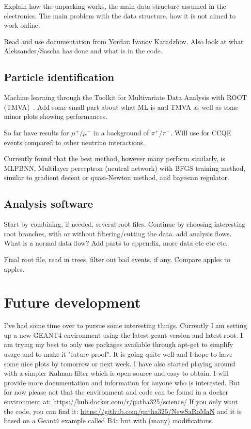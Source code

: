 Explain how the unpacking works, the main data structure assumed in the electronics. The main problem with the data structure, how it is not aimed to work online. 

Read and use documentation from Yordan Ivanov Karadzhov. Also look at what Aleksander/Sascha has done and what is in the code.


\subsection{Particle identification}
Machine learning through the Toolkit for Multivariate Data Analysis with ROOT (TMVA)~\cite{TMVA}. Add some small part about what ML is and TMVA as well as some minor plots showing performances.

So far have results for $\mu^+/\mu^-$ in a background of  $\pi^+/\pi^-$. Will use for CCQE events compared to other neutrino interactions.

Currently found that the best method, however many perform similarly, is MLPBNN, Multilayer perceptron (neutral network) with BFGS training method, similar to gradient decent or quasi-Newton method, and bayesian regulator.

\subsection{Analysis software}
Start by combining, if needed, several root files. Continue by choosing interesting root branches, with or without filtering/cutting the data.
add analysis flows. What is a normal data flow? Add parts to appendix, more data etc etc etc.

Final root file, read in trees, filter out bad events, if any. Compare apples to apples. 

\pagebreak
\section{Future development}
I've had some time over to pursue some interesting things. Currently I am setting up a new GEANT4 environment using the latest geant version and latest root. I am trying my best to only use packages available through apt-get to simplify usage and to make it "future proof". It is going quite well and I hope to have some nice plots by tomorrow or next week. I have also started playing around with a simpler Kalman filter which is open source and easy to obtain. I will provide more documentation and information for anyone who is interested. But for now please not that the environment and code can be found in  a docker environment at: \url{https://hub.docker.com/r/patha325/science/} If you only want the code, you can find it: \url{https://github.com/patha325/NewSaRoMaN} and it is based on a Geant4 example called B4c but with (many) modifications.

